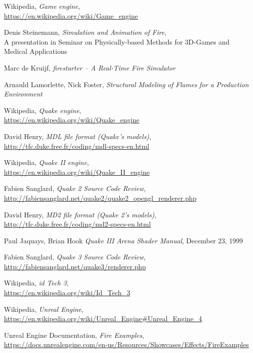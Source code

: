 \begin{thebibliography}{x}

  Wikipedia,
  \textit{Game engine}, \\
  \url{https://en.wikipedia.org/wiki/Game_engine}

  Denis Steinemann,
  \textit{Simulation and Animation of Fire}, \\
  A presentation in Seminar on Physically-based Methods for 3D-Games and Medical Applications
  
  Marc de Kruijf,
  \textit{firestarter – A Real-Time Fire Simulator}

 Arnauld Lamorlette, Nick Foster,
 \textit{Structural Modeling of Flames for a Production Environment}

 Wikipedia, 
 \textit{Quake engine},\\
 \url{https://en.wikipedia.org/wiki/Quake_engine}
 
 David Henry, 
 \textit{MDL file format (Quake's models)},\\
 \url{http://tfc.duke.free.fr/coding/mdl-specs-en.html}

 Wikipedia, 
 \textit{Quake II engine},\\
 \url{https://en.wikipedia.org/wiki/Quake_II_engine}

 Fabien Sanglard, 
 \textit{Quake 2 Source Code Review},\\
 \url{http://fabiensanglard.net/quake2/quake2_opengl_renderer.php}

 David Henry, 
 \textit{MD2 file format (Quake 2's models)},\\
 \url{http://tfc.duke.free.fr/coding/md2-specs-en.html}

  Paul Jaquays, Brian Hook
  \textit{Quake III Arena Shader Manual},
  December 23, 1999

  Fabien Sanglard, 
  \textit{Quake 3 Source Code Review},\\
  \url{http://fabiensanglard.net/quake3/renderer.php}

 Wikipedia, 
 \textit{id Tech 3},\\
 \url{https://en.wikipedia.org/wiki/Id_Tech_3}

 Wikipedia, 
 \textit{Unreal Engine},\\
 \url{https://en.wikipedia.org/wiki/Unreal_Engine#Unreal_Engine_4}

 Unreal Engine Documentation, 
 \textit{Fire Examples},\\
 \url{https://docs.unrealengine.com/en-us/Resources/Showcases/Effects/FireExamples}

\end{thebibliography}


